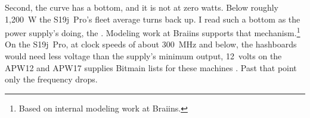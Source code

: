 Second, the curve has a bottom, and it is not at zero watts. Below roughly 1,200~W the S19j~Pro's fleet average turns back up. I read such a bottom as the power supply's doing, the . Modeling work at Braiins supports that mechanism.\footnote{Based on internal modeling work at Braiins.} On the S19j~Pro, at clock speeds of about 300~MHz and below, the hashboards would need less voltage than the supply's minimum output, 12~volts on the APW12 and APW17 supplies Bitmain lists for these machines \autocite{bitmain2025psu}. Past that point only the frequency drops. %
